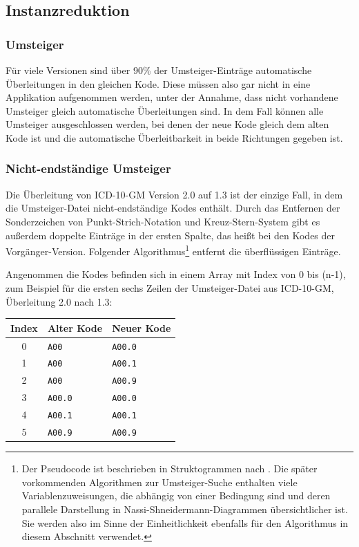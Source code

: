 \subsection{Instanzreduktion}
 
\subsubsection{Umsteiger}

Für viele Versionen sind über 90\% der Umsteiger-Einträge automatische Überleitungen in den gleichen Kode. Diese müssen also gar nicht in eine Applikation aufgenommen werden, unter der Annahme, dass nicht vorhandene Umsteiger gleich automatische Überleitungen sind. In dem Fall können alle Umsteiger ausgeschlossen werden, bei denen der neue Kode gleich dem alten Kode ist und die automatische Überleitbarkeit in beide Richtungen gegeben ist. 

\newpage

\subsubsection{Nicht-endständige Umsteiger}

Die Überleitung von ICD-10-GM Version 2.0 auf 1.3 ist der einzige Fall, in dem die Umsteiger-Datei nicht-endständige Kodes enthält. Durch das Entfernen der Sonderzeichen von Punkt-Strich-Notation und Kreuz-Stern-System gibt es außerdem doppelte Einträge in der ersten Spalte, das heißt bei den Kodes der Vorgänger-Version. Folgender Algorithmus\footnote{Der Pseudocode ist beschrieben in Struktogrammen nach \citep{nassishneid}. Die später vorkommenden Algorithmen zur Umsteiger-Suche enthalten viele Variablenzuweisungen, die abhängig von einer Bedingung sind und deren parallele Darstellung in Nassi-Shneidermann-Diagrammen übersichtlicher ist. Sie werden also im Sinne der Einheitlichkeit ebenfalls für den Algorithmus in diesem Abschnitt verwendet.}
entfernt die überflüssigen Einträge.

Angenommen die Kodes befinden sich in einem Array mit Index von 0 bis (n-1), zum Beispiel für die ersten sechs Zeilen der Umsteiger-Datei aus ICD-10-GM, Überleitung 2.0 nach 1.3: 

\begingroup
\renewcommand{\arraystretch}{1.2}
\setlength{\tabcolsep}{12pt}
\begin{tabular}{cll}
Index & Alter Kode & Neuer Kode \\
\hline
0 & \texttt{A00} & \texttt{A00.0}  \\
1 & \texttt{A00} & \texttt{A00.1} \\
2 & \texttt{A00} & \texttt{A00.9} \\
3 & \texttt{A00.0} & \texttt{A00.0} \\
4 & \texttt{A00.1} & \texttt{A00.1} \\
5 & \texttt{A00.9} & \texttt{A00.9} \\
\end{tabular}
\endgroup

